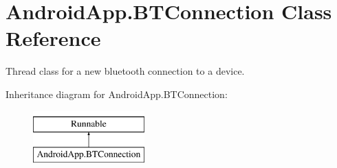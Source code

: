 \hypertarget{class_android_app_1_1_b_t_connection}{}\section{Android\+App.\+B\+T\+Connection Class Reference}
\label{class_android_app_1_1_b_t_connection}


Thread class for a new bluetooth connection to a device.  


Inheritance diagram for Android\+App.\+B\+T\+Connection\+:\begin{figure}[H]
\begin{center}
\leavevmode
\includegraphics[height=2.000000cm]{class_android_app_1_1_b_t_connection}
\end{center}
\end{figure}
